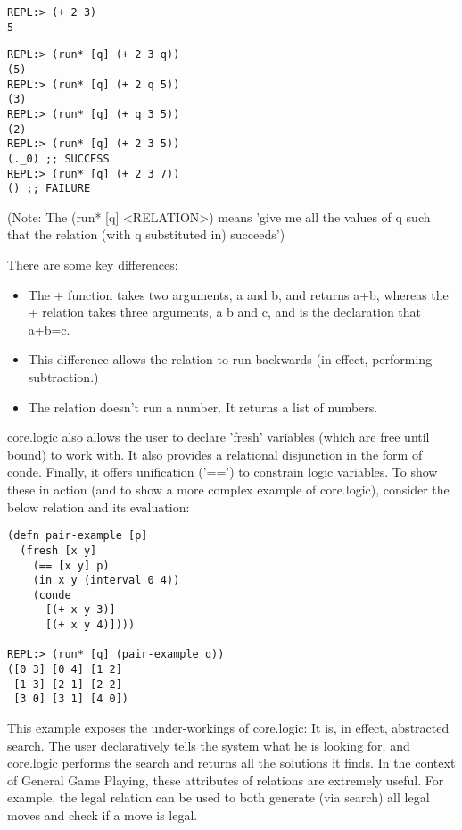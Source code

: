 \documentclass[letterpaper]{article}
\begin{document}
\begin{lstlisting}[frame=single, caption=The + function]
REPL:> (+ 2 3)
5
\end{lstlisting}

\begin{lstlisting}[frame=single, caption=The + relation]
REPL:> (run* [q] (+ 2 3 q))
(5)
REPL:> (run* [q] (+ 2 q 5))
(3)
REPL:> (run* [q] (+ q 3 5))
(2)
REPL:> (run* [q] (+ 2 3 5))
(._0) ;; SUCCESS
REPL:> (run* [q] (+ 2 3 7))
() ;; FAILURE
\end{lstlisting}

(Note: The (run* [q] \textless RELATION\textgreater) means 'give me all the values of q such that the relation (with q substituted in) succeeds')

There are some key differences:
\begin{itemize}
\item The + function takes two arguments, a and b, and returns a+b, whereas the + relation takes three arguments, a b and c, and is the declaration that a+b=c.
\item This difference allows the relation to run backwards (in effect, performing subtraction.)
\item The relation doesn't run a number. It returns a list of numbers.
\end{itemize}

core.logic also allows the user to declare 'fresh' variables (which are free until bound) to work with. It also provides a relational disjunction in the form of conde. Finally, it offers unification ('==') to constrain logic variables. To show these in action (and to show a more complex example of core.logic), consider the below relation and its evaluation:

\begin{lstlisting}[frame=single, caption=Relation to generate all pairs of whole numbers (x y) such that x+y equals 3 or 4]
(defn pair-example [p]
  (fresh [x y]
    (== [x y] p)
    (in x y (interval 0 4))
    (conde
      [(+ x y 3)]
      [(+ x y 4)])))

REPL:> (run* [q] (pair-example q))
([0 3] [0 4] [1 2]
 [1 3] [2 1] [2 2]
 [3 0] [3 1] [4 0])
\end{lstlisting}

This example exposes the under-workings of core.logic: It is, in effect, abstracted search. The user declaratively tells the system what he is looking for, and core.logic performs the search and returns all the solutions it finds. In the context of General Game Playing, these attributes of relations are extremely useful. For example, the legal relation can be used to both generate (via search) all legal moves and check if a move is legal.
\end{document}
